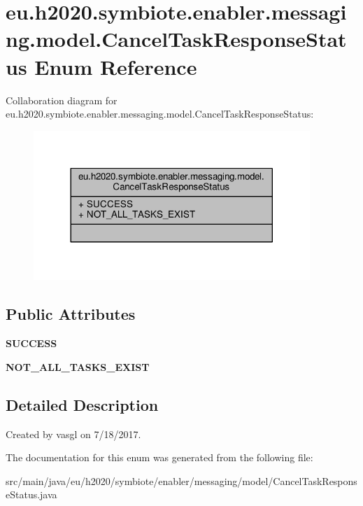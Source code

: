 \hypertarget{enumeu_1_1h2020_1_1symbiote_1_1enabler_1_1messaging_1_1model_1_1CancelTaskResponseStatus}{}\section{eu.\+h2020.\+symbiote.\+enabler.\+messaging.\+model.\+Cancel\+Task\+Response\+Status Enum Reference}
\label{enumeu_1_1h2020_1_1symbiote_1_1enabler_1_1messaging_1_1model_1_1CancelTaskResponseStatus}


Collaboration diagram for eu.\+h2020.\+symbiote.\+enabler.\+messaging.\+model.\+Cancel\+Task\+Response\+Status\+:\nopagebreak
\begin{figure}[H]
\begin{center}
\leavevmode
\includegraphics[width=296pt]{enumeu_1_1h2020_1_1symbiote_1_1enabler_1_1messaging_1_1model_1_1CancelTaskResponseStatus__coll__graph}
\end{center}
\end{figure}
\subsection*{Public Attributes}
\begin{DoxyCompactItemize}
\item 
\mbox{\label{enumeu_1_1h2020_1_1symbiote_1_1enabler_1_1messaging_1_1model_1_1CancelTaskResponseStatus_a6267a3e687115bd5129daa2e5002513d}} 
{\bfseries S\+U\+C\+C\+E\+SS}
\item 
\mbox{\label{enumeu_1_1h2020_1_1symbiote_1_1enabler_1_1messaging_1_1model_1_1CancelTaskResponseStatus_aceea4c0dedde0577def8baf84c53e180}} 
{\bfseries N\+O\+T\+\_\+\+A\+L\+L\+\_\+\+T\+A\+S\+K\+S\+\_\+\+E\+X\+I\+ST}
\end{DoxyCompactItemize}


\subsection{Detailed Description}
Created by vasgl on 7/18/2017. 

The documentation for this enum was generated from the following file\+:\begin{DoxyCompactItemize}
\item 
src/main/java/eu/h2020/symbiote/enabler/messaging/model/Cancel\+Task\+Response\+Status.\+java\end{DoxyCompactItemize}
